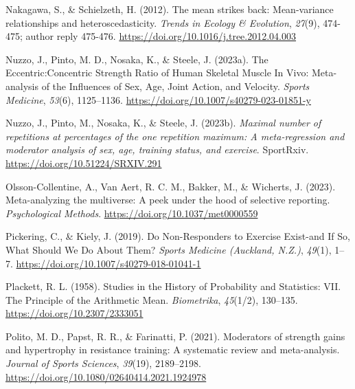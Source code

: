 \documentclass[
]{article}
\newlength{\cslhangindent}
\newlength{\cslentryspacingunit} %
\newenvironment{CSLReferences}[2] %
 {%
  \setlength{\parindent}{0pt}
  \ifodd #1
  \let\oldpar\par
  \def\par{\hangindent=\cslhangindent\oldpar}
  \fi
  \setlength{\parskip}{#2\cslentryspacingunit}
 }%
 {}
\begin{document}
\begin{CSLReferences}{1}{0}
\leavevmode{}%
Nakagawa, S., \& Schielzeth, H. (2012). The mean strikes back: Mean-variance relationships and heteroscedasticity. \emph{Trends in Ecology \& Evolution}, \emph{27}(9), 474-475; author reply 475-476. \url{https://doi.org/10.1016/j.tree.2012.04.003}

\leavevmode{}%
Nuzzo, J., Pinto, M. D., Nosaka, K., \& Steele, J. (2023a). The {Eccentric}:{Concentric} {Strength} {Ratio} of {Human} {Skeletal} {Muscle} {In} {Vivo}: {Meta}-analysis of the {Influences} of {Sex}, {Age}, {Joint} {Action}, and {Velocity}. \emph{Sports Medicine}, \emph{53}(6), 1125--1136. \url{https://doi.org/10.1007/s40279-023-01851-y}

\leavevmode{}%
Nuzzo, J., Pinto, M., Nosaka, K., \& Steele, J. (2023b). \emph{Maximal number of repetitions at percentages of the one repetition maximum: {A} meta-regression and moderator analysis of sex, age, training status, and exercise}. SportRxiv. \url{https://doi.org/10.51224/SRXIV.291}

\leavevmode{}%
Olsson-Collentine, A., Van Aert, R. C. M., Bakker, M., \& Wicherts, J. (2023). Meta-analyzing the multiverse: {A} peek under the hood of selective reporting. \emph{Psychological Methods}. \url{https://doi.org/10.1037/met0000559}

\leavevmode{}%
Pickering, C., \& Kiely, J. (2019). Do {Non}-{Responders} to {Exercise} {Exist}-and {If} {So}, {What} {Should} {We} {Do} {About} {Them}? \emph{Sports Medicine (Auckland, N.Z.)}, \emph{49}(1), 1--7. \url{https://doi.org/10.1007/s40279-018-01041-1}

\leavevmode{}%
Plackett, R. L. (1958). Studies in the {History} of {Probability} and {Statistics}: {VII}. {The} {Principle} of the {Arithmetic} {Mean}. \emph{Biometrika}, \emph{45}(1/2), 130--135. \url{https://doi.org/10.2307/2333051}

\leavevmode{}%
Polito, M. D., Papst, R. R., \& Farinatti, P. (2021). Moderators of strength gains and hypertrophy in resistance training: {A} systematic review and meta-analysis. \emph{Journal of Sports Sciences}, \emph{39}(19), 2189--2198. \url{https://doi.org/10.1080/02640414.2021.1924978}


\end{CSLReferences}
\end{document}
